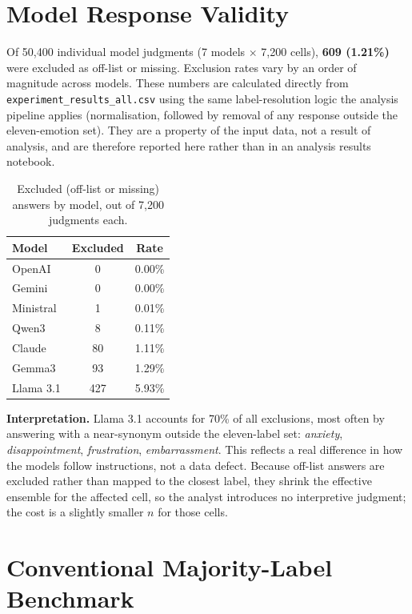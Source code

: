 \section{Model Response Validity}
\label{res:offlist}

\noindent
Of 50{,}400 individual model judgments (7 models $\times$ 7{,}200 cells), \textbf{609 (1.21\%)}
were excluded as off-list or missing. Exclusion rates vary by an order of magnitude across models.
These numbers are calculated directly from \texttt{experiment\_results\_all.csv} using the same
label-resolution logic the analysis pipeline applies (normalisation, followed by removal of any
response outside the eleven-emotion set). They are a property of the input data, not a result of
analysis, and are therefore reported here rather than in an analysis results notebook.

\begin{table}[h]
\centering
\footnotesize
\caption{Excluded (off-list or missing) answers by model, out of 7{,}200 judgments each.}
\label{tab:offlist}
\begin{tabular}{lcc}
\hline
\textbf{Model} & \textbf{Excluded} & \textbf{Rate} \\
\hline
OpenAI & 0 & 0.00\% \\
Gemini & 0 & 0.00\% \\
Ministral & 1 & 0.01\% \\
Qwen3 & 8 & 0.11\% \\
Claude & 80 & 1.11\% \\
Gemma3 & 93 & 1.29\% \\
Llama 3.1 & 427 & 5.93\% \\
\hline
\end{tabular}
\end{table}

\noindent
\textbf{Interpretation.} Llama 3.1 accounts for 70\% of all exclusions, most often by answering
with a near-synonym outside the eleven-label set: \emph{anxiety}, \emph{disappointment},
\emph{frustration}, \emph{embarrassment}. This reflects a real difference in how the models follow
instructions, not a data defect. Because off-list answers are excluded rather than mapped to the closest label,
they shrink the effective ensemble for the affected cell, so the analyst introduces no interpretive
judgment; the cost is a slightly smaller $n$ for those cells.

\section{Conventional Majority-Label Benchmark}
\label{res:majoritybenchmark}

